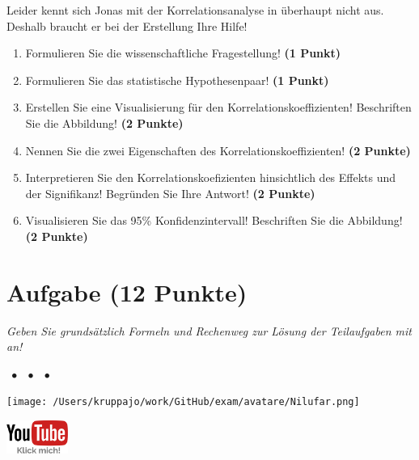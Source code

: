 \documentclass[a4paper, 9pt]{scrartcl}\usepackage[]{graphicx}\usepackage[]{xcolor}
\begin{document}
Leider kennt sich Jonas mit der Korrelationsanalyse in \Rlogo überhaupt nicht aus. Deshalb braucht er bei der Erstellung Ihre Hilfe!

\begin{enumerate}
  \item Formulieren Sie die wissenschaftliche Fragestellung! \textbf{(1 Punkt)}
  \item Formulieren Sie das statistische Hypothesenpaar! \textbf{(1 Punkt)}
\item Erstellen Sie eine Visualisierung für den Korrelationskoeffizienten! Beschriften Sie die Abbildung! \textbf{(2 Punkte)}
\item Nennen Sie die zwei Eigenschaften des Korrelationskoeffizienten! \textbf{(2 Punkte)}
\item Interpretieren Sie den Korrelationskoefizienten hinsichtlich des
  Effekts und der Signifikanz! Begründen Sie Ihre Antwort! \textbf{(2 Punkte)}
\item Visualisieren Sie das 95\% Konfidenzintervall! Beschriften Sie die Abbildung! \textbf{(2 Punkte)} 
\end{enumerate} 
\clearpage

\section{Aufgabe \hfill (12 Punkte)}

\textit{Geben Sie grundsätzlich Formeln und Rechenweg zur Lösung der Teilaufgaben mit an!} \\[1Ex]
 

 
\ifcollection
\begin{flushright}
\tiny\vspace{-3Ex}
\textbf{\examinhaltstart}
\exammodulestat $\;\bullet$
\exammodulestatbbv $\;\bullet$
\exammodulestatversuch $\;\bullet$
\exammodulebiostat
\vspace{-4Ex}
\end{flushright}
\begin{minipage}[t]{0.5\textwidth}
\texttt{[image: /Users/kruppajo/work/GitHub/exam/avatare/Nilufar.png]}
\end{minipage}
\begin{minipage}[t]{0.5\textwidth}
\hfill
\href{https://youtu.be/fB6nF4dxodA}{\includegraphics[width = 2cm]{img/youtube}}
\end{minipage}
\vspace{-3ex}
\fi
\end{document}
